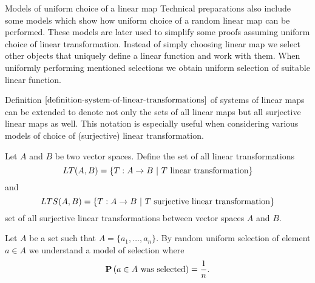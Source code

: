 \begin{section}{Models of uniform choice of a linear map}
Technical preparations also include some models which show how uniform choice of a random linear map can be performed. These models are later used to simplify some proofs assuming uniform choice of linear transformation. Instead of simply choosing linear map we select other objects that uniquely define a linear function and work with them. When uniformly performing mentioned selections we obtain uniform selection of suitable linear function.

Definition $\ref{definition-system-of-linear-transformations}$ of systems of linear maps can be extended to denote not only the sets of all linear maps but all surjective linear maps as well. This notation is especially useful when considering various models of choice of (surjective) linear transformation.
\begin{definition}
Let $A$ and $B$ be two vector spaces. Define the set of all linear transformations
\[
LT(A, B) = \{ T: A \rightarrow B \ | \  T \text{ linear transformation} \}
\]
and
\[
LTS(A, B) = \{ T: A \rightarrow B \ | \  T \text{ surjective linear transformation} \}
\] set of all surjective linear transformations between vector spaces $A$ and $B$.
\end{definition} 

\begin{definition}
Let $A$ be a set such that $A = \{ a_1, \dots, a_n \}$. By random uniform selection of element $a \in A$ we understand a model of selection where 
\[
	\mathbf{P}\left(a \in A \text{ was selected}\right) = \frac{1}{n} \text{.}
\]
\end{definition}


\end{section}
